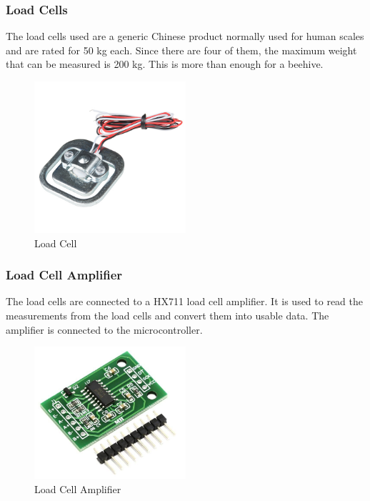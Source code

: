 \subsubsection{Load Cells}
The load cells used are a generic Chinese product normally used for human scales and are rated for 50 kg each. Since there are four of them, the maximum weight that can be measured is 200 kg. This is more than enough for a beehive.

\begin{figure}
    \centering
    \includegraphics[width=0.5\textwidth]{figures/loadcell.jpg}
    \caption{Load Cell}
    \label{fig:loadcell}
\end{figure}

\newpage
\subsubsection{Load Cell Amplifier}
The load cells are connected to a HX711 load cell amplifier. It is used to read the measurements from the load cells and convert them into usable data. The amplifier is connected to the microcontroller.

\begin{figure}
    \centering
    \includegraphics[width=0.5\textwidth]{figures/hx711.jpg}
    \caption{Load Cell Amplifier}
    \label{fig:loadcell_amplifier}
\end{figure}


